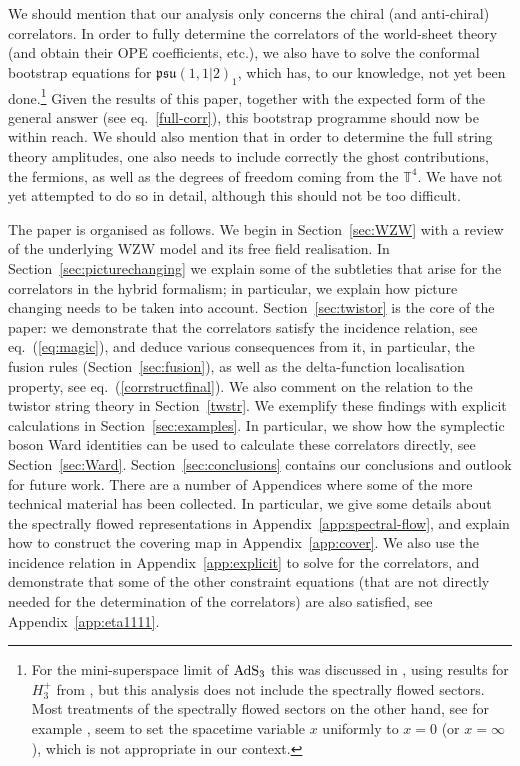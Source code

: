 \documentclass[a4paper,11pt]{article}
\numberwithin{equation}{section}
\begin{document}
We should mention that our analysis only concerns the chiral (and anti-chiral) correlators. In order to fully determine the correlators of the world-sheet theory (and obtain their OPE coefficients, etc.), we also have to solve the conformal bootstrap equations for $\mathfrak{psu}(1,1|2)_1$, which has, to our knowledge, not yet been done.\footnote{For the mini-superspace limit of ${\rm AdS}_3$ this was discussed in \cite{Ribault:2009ui}, using results for $H_3^+$ from \cite{Teschner:1997fv,Teschner:2001gi}, but this analysis does not include the spectrally flowed sectors. Most treatments of the spectrally flowed sectors on the other hand, see for example \cite{Ribault:2005ms,Giribet:2005mc,Baron:2008qf}, seem to set the spacetime variable $x$ uniformly to $x=0$ (or $x=\infty$), which is not appropriate in our context.} Given the results of this paper, together with the expected form of the general answer (see eq.~\eqref{full-corr}), this bootstrap programme should now be within reach. We should also mention that in order to determine the full string theory amplitudes, one also needs to include correctly the ghost contributions, the fermions, as well as the degrees of freedom coming from the $\mathbb{T}^4$. We have not yet attempted to do so in detail, although this should not be too difficult.



\medskip

The paper is organised as follows. We begin in Section~\ref{sec:WZW} with a review of the underlying WZW model and its free field realisation. In Section~\ref{sec:picturechanging} we explain some of the subtleties that arise for the correlators in the hybrid formalism; in particular, we explain how picture changing needs to be taken into account. Section~\ref{sec:twistor}  is the core of the paper: we demonstrate that the correlators satisfy the incidence relation, see eq.~(\ref{eq:magic}), and deduce various consequences from it, in particular, the fusion rules (Section~\ref{sec:fusion}), as well as the delta-function localisation property, see eq.~(\ref{corrstructfinal}). We also comment on the relation to the twistor string theory in Section~\ref{twstr}. We exemplify these findings with explicit calculations in Section~\ref{sec:examples}. In particular, we show how the symplectic boson Ward identities can be used to calculate these correlators directly, see Section~\ref{sec:Ward}. Section~\ref{sec:conclusions} contains our conclusions and outlook for future work. There are a number of Appendices where some of the more technical material has been collected. In particular, we give some details about the spectrally flowed representations in Appendix~\ref{app:spectral-flow}, and explain how to construct the covering map in Appendix~\ref{app:cover}. We also use the incidence relation in Appendix~\ref{app:explicit} to solve for the correlators, and demonstrate that some of the other constraint equations (that are not directly needed for the determination of the correlators) are also satisfied, see Appendix~\ref{app:eta1111}.  
\end{document}

